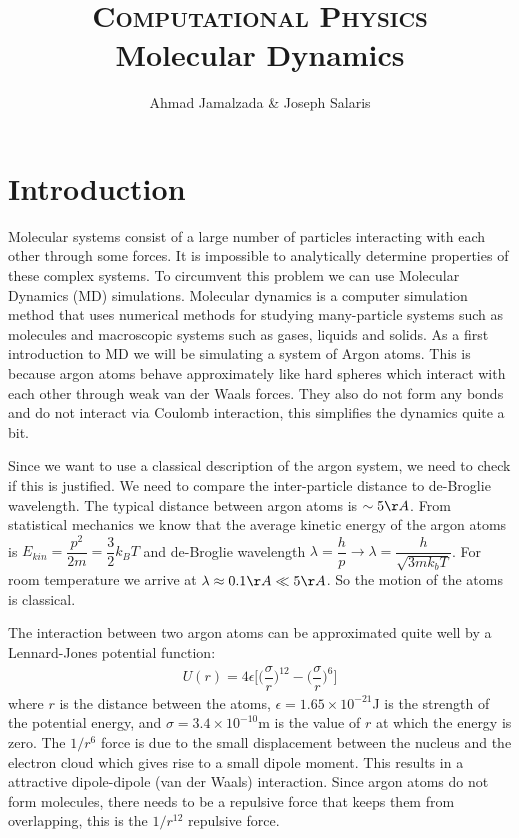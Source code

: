 \documentclass[11pt]{article}
\author{Ahmad Jamalzada \& Joseph Salaris}
\title{\textsc{\Huge Computational Physics}\\Molecular Dynamics}
\begin{document}
\maketitle

\section{Introduction}
Molecular systems consist of a large number of particles interacting with each other through some forces. It is impossible to analytically determine properties of these complex systems. To circumvent this problem we can use Molecular Dynamics (MD) simulations.
Molecular dynamics is a computer simulation method that uses numerical methods for studying many-particle systems such as molecules and macroscopic systems such as gases, liquids and solids.
As a first introduction to MD we will be simulating a system of Argon atoms. This is because argon atoms behave approximately like hard spheres which interact with each other through weak van der Waals forces. They also do not form any bonds and do not interact via Coulomb interaction, this simplifies the dynamics quite a bit.

Since we want to use a classical description of the argon system, we need to check if this is justified. We need to compare the inter-particle distance to de-Broglie wavelength. The typical distance between argon atoms is $\sim 5 \AA$.\cite{lattice} From statistical mechanics we know that the average kinetic energy of the argon atoms is $E_{kin} = \dfrac{p^2}{2m}=\dfrac{3}{2}k_BT$ and de-Broglie wavelength $\lambda=\dfrac{h}{p} \rightarrow \lambda = \dfrac{h}{\sqrt{3mk_bT}}$. For room temperature we arrive at $\lambda \approx 0.1 \AA \ll 5\AA$. So the motion of the atoms is classical.

The interaction between two argon atoms can be approximated quite well by a Lennard-Jones potential function:
\begin{align*}
U(r)=4\epsilon\Big[\Big(\dfrac{\sigma}{r}\Big)^{12}-\Big(\dfrac{\sigma}{r}\Big)^6\Big]
\end{align*}
where $r$ is the distance between the atoms, $\epsilon=1.65\times10^{-21}$J is the strength of the potential energy, and $\sigma = 3.4\times 10^{-10}$m is the value of $r$ at which the energy is zero. The $1/r^6$ force is due to the small displacement between the nucleus and the electron cloud which gives rise to a small dipole moment. This results in a attractive dipole-dipole (van der Waals) interaction. 
Since argon atoms do not form molecules, there needs to be a repulsive force that keeps them from overlapping, this is the $1/r^{12}$ repulsive force.
\end{document}
